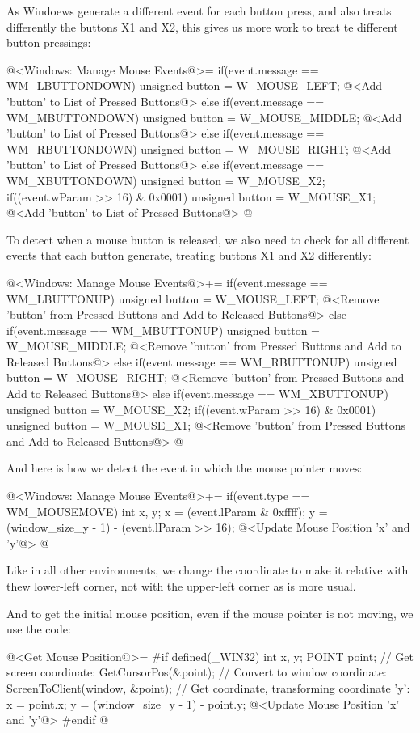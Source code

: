 As Windoews generate a different event for each button press, and also
treats differently the buttons X1 and X2, this gives us more work to
treat te different button pressings:

\iniciocodigo
@<Windows: Manage Mouse Events@>=
if(event.message == WM_LBUTTONDOWN){
  unsigned button = W_MOUSE_LEFT;
  @<Add 'button' to List of Pressed Buttons@>
}
else if(event.message == WM_MBUTTONDOWN){
  unsigned button = W_MOUSE_MIDDLE;
  @<Add 'button' to List of Pressed Buttons@>
}
else if(event.message == WM_RBUTTONDOWN){
  unsigned button = W_MOUSE_RIGHT;
  @<Add 'button' to List of Pressed Buttons@>
}
else if(event.message == WM_XBUTTONDOWN){
  unsigned button = W_MOUSE_X2;
  if((event.wParam >> 16) & 0x0001){
    unsigned button = W_MOUSE_X1;
  }
  @<Add 'button' to List of Pressed Buttons@>
}
@
\fimcodigo

To detect when a mouse button is released, we also need to check for
all different events that each button generate, treating buttons X1
and X2 differently:

\iniciocodigo
@<Windows: Manage Mouse Events@>+=
if(event.message == WM_LBUTTONUP){
  unsigned button = W_MOUSE_LEFT;
  @<Remove 'button' from Pressed Buttons and Add to Released Buttons@>
}
else if(event.message == WM_MBUTTONUP){
  unsigned button = W_MOUSE_MIDDLE;
  @<Remove 'button' from Pressed Buttons and Add to Released Buttons@>
}
else if(event.message == WM_RBUTTONUP){
  unsigned button = W_MOUSE_RIGHT;
  @<Remove 'button' from Pressed Buttons and Add to Released Buttons@>
}
else if(event.message == WM_XBUTTONUP){
  unsigned button = W_MOUSE_X2;
  if((event.wParam >> 16) & 0x0001){
    unsigned button = W_MOUSE_X1;
  }
  @<Remove 'button' from Pressed Buttons and Add to Released Buttons@>
}
@
\fimcodigo

And here is how we detect the event in which the mouse pointer moves:

\iniciocodigo
@<Windows: Manage Mouse Events@>+=
if(event.type == WM_MOUSEMOVE){
  int x, y;
  x = (event.lParam & 0xffff);
  y = (window_size_y - 1) - (event.lParam >> 16);
  @<Update Mouse Position 'x' and 'y'@>
}
@
\fimcodigo

Like in all other environments, we change the coordinate to make it
relative with thew lower-left corner, not with the upper-left corner
as is more usual.

And to get the initial mouse position, even if the mouse pointer is
not moving, we use the code:

\iniciocodigo
@<Get Mouse Position@>=
#if defined(_WIN32)
{
  int x, y;
  POINT point;
  // Get screen coordinate:
  GetCursorPos(&point);
  // Convert to window coordinate:
  ScreenToClient(window, &point);
  // Get coordinate, transforming coordinate 'y':
  x = point.x;
  y = (window_size_y - 1) - point.y;
  @<Update Mouse Position 'x' and 'y'@>
}
#endif
@
\fimcodigo


